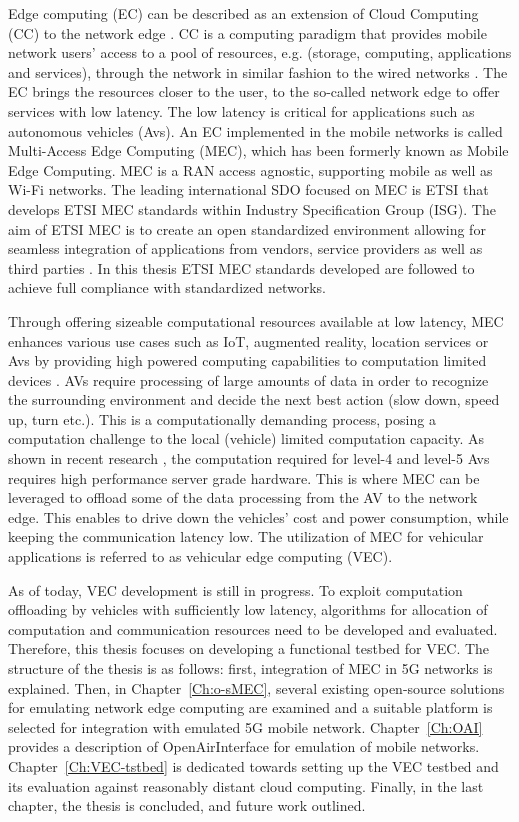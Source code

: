 \documentclass[12pt,a4paper,twoside]{report}
\begin{document}
Edge computing (EC) can be described as an extension of Cloud Computing (CC) to the network edge \cite{sabella-mec-sw-dev}. CC is a computing paradigm that provides mobile network users’ access to a pool of resources, e.g. (storage, computing, applications and services), through the network in similar fashion to the wired networks \cite{mell2011nistCC}. The EC brings the resources closer to the user, to the so-called network edge to offer services with low latency. The low latency is critical for applications such as autonomous vehicles (Avs). An EC implemented in the mobile networks is called Multi-Access Edge Computing (MEC), which has been formerly known as Mobile Edge Computing. MEC is a RAN access agnostic, supporting mobile as well as Wi-Fi networks. The leading international SDO focused on MEC is ETSI that develops ETSI MEC standards within Industry Specification Group (ISG). The aim of ETSI MEC is to create an open standardized environment allowing for seamless integration of applications from vendors, service providers as well as third parties \cite{mec-etsi-web}. In this thesis ETSI MEC standards developed are followed to achieve full compliance with standardized networks. 

Through offering sizeable computational resources available at low latency, MEC enhances various use cases such as IoT, augmented reality, location services or Avs by providing high powered computing capabilities to computation limited devices \cite{mec-etsi-web}. AVs require processing of large amounts of data in order to recognize the surrounding environment and decide the next best action (slow down, speed up, turn etc.). This is a computationally demanding process, posing a computation challenge to the local (vehicle) limited computation capacity. As shown in recent research \cite{zhao2019towards}, the computation required for level-4 and level-5 Avs requires high performance server grade hardware. This is where MEC can be leveraged to offload some of the data processing from the AV to the network edge. This enables to drive down the vehicles’ cost and power consumption, while keeping the communication latency low. The utilization of MEC for vehicular applications is referred to as vehicular edge computing (VEC). 

As of today, VEC development is still in progress. To exploit computation offloading by vehicles with sufficiently low latency, algorithms for allocation of computation and communication resources need to be developed and evaluated. Therefore, this thesis focuses on developing a functional testbed for VEC. The structure of the thesis is as follows: first, integration of MEC in 5G networks is explained. Then, in Chapter~\ref{Ch:o-sMEC}, several existing open-source solutions for emulating network edge computing are examined and a suitable platform is selected for integration with emulated 5G mobile network. Chapter~\ref{Ch:OAI} provides a description of OpenAirInterface for emulation of mobile networks. Chapter~\ref{Ch:VEC-tstbed} is dedicated towards setting up the VEC testbed and its evaluation against reasonably distant cloud computing. Finally, in the last chapter, the thesis is concluded, and future work outlined.
\end{document}
